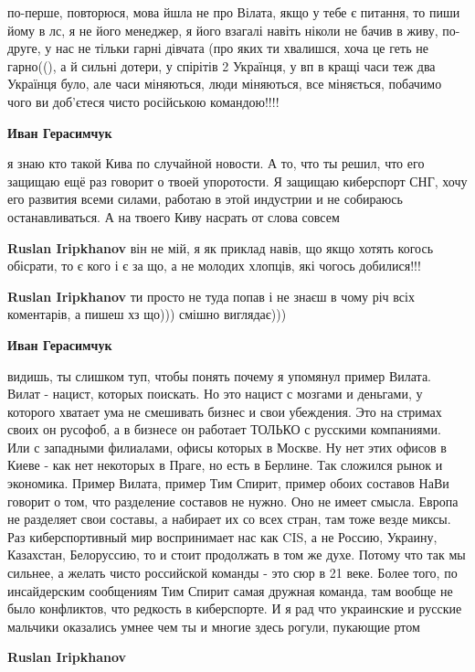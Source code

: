 \begin{itemize}
\begin{itemize}
\begin{itemize}
по-перше, повторюся, мова йшла не про Вілата, якщо у тебе є питання, то пиши
йому в лс, я не його менеджер, я його взагалі навіть ніколи не бачив в живу,
по-друге, у нас не тільки гарні дівчата (про яких ти хвалишся, хоча це геть не
гарно((), а й сильні дотери, у спірітів 2 Українця, у вп в кращі часи теж два
Українця було, але часи міняються, люди міняються, все міняється, побачимо чого
ви доб'єтеся чисто російською командою!!!!


\textbf{Иван Герасимчук} 

я знаю кто такой Кива по случайной новости. А то, что ты решил, что его защищаю
ещё раз говорит о твоей упоротости. Я защищаю киберспорт СНГ, хочу его развития
всеми силами, работаю в этой индустрии и не собираюсь останавливаться. А на
твоего Киву насрать от слова совсем

\textbf{Ruslan Iripkhanov} він не мій, я як приклад навів, що якщо хотять когось обісрати, то є кого і є за що, а не молодих хлопців, які чогось добилися!!!

\textbf{Ruslan Iripkhanov} ти просто не туда попав і не знаєш в чому річ всіх коментарів, а пишеш хз що))) смішно виглядає)))

\textbf{Иван Герасимчук} 

видишь, ты слишком туп, чтобы понять почему я упомянул пример Вилата. Вилат -
нацист, которых поискать. Но это нацист с мозгами и деньгами, у которого
хватает ума не смешивать бизнес и свои убеждения. Это на стримах своих он
русофоб, а в бизнесе он работает ТОЛЬКО с русскими компаниями. Или с западными
филиалами, офисы которых в Москве. Ну нет этих офисов в Киеве - как нет
некоторых в Праге, но есть в Берлине. Так сложился рынок и экономика. Пример
Вилата, пример Тим Спирит, пример обоих составов НаВи говорит о том, что
разделение составов не нужно. Оно не имеет смысла. Европа не разделяет свои
составы, а набирает их со всех стран, там тоже везде миксы. Раз киберспортивный
мир воспринимает нас как CIS, а не Россию, Украину, Казахстан, Белоруссию, то и
стоит продолжать в том же духе. Потому что так мы сильнее, а желать чисто
российской команды - это сюр в 21 веке. Более того, по инсайдерским сообщениям
Тим Спирит самая дружная команда, там вообще не было конфликтов, что редкость в
киберспорте. И я рад что украинские и русские мальчики оказались умнее чем ты и
многие здесь рогули, пукающие ртом

\textbf{Ruslan Iripkhanov} 


\end{itemize}
\end{itemize}
\end{itemize}
